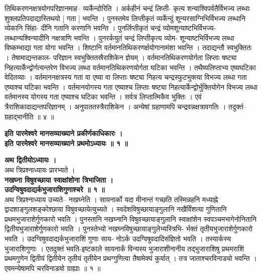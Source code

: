 \documentclass[11pt, openany]{book}
\begin{document}
{{{{\vspace{2mm}
\justifying
 तिथिकरणनक्षत्रयोगपरिज्ञानमाह-- व्यर्केन्दोरिति । अर्कहीनं
चन्द्रं लिप्ती- 
कृत्य शन्याश्विपर्वतैर्विभज्य लब्धाः शुक्लप्रतिपदाद्यास्तिथयो [ गता
] भवन्ति । 
पुनस्तमेव लिप्तीकृतं व्यर्केन्दुं शून्यरसाग्निभिर्विभज्य लब्धानि
व्येकानि सिंहा-
दीनि गतानि करणानि भवन्ति । पुनर्लिप्तीकृतं चन्द्रं
व्योमशून्याष्टभिर्विभज्य-
लब्धान्यश्विन्यादीनि नक्षत्राणि भवन्ति । पुनरर्कयुतं चन्द्रं
लिप्तीकृत्य व्योम-
शून्याष्टभिर्विभज्य लब्धा विष्कम्भाद्या गता योगा भवन्ति । शिष्टानि
वर्तमानतिथिकरणर्क्षयोगानामंशा भवन्ति । तदाद्यन्तौ स्वभुक्तितः ।
तेषामाद्यन्तकाल-
परिज्ञान स्वभुक्तितस्रैराशिकेन ज्ञेयम् । वर्तमानतिथिकरणयोर्गता
लिप्ताः षष्ट्या 
निहत्यार्केन्द्वोर्गत्यन्तरेण विभज्य लब्धा वर्तमानतिथिकरणयोर्गता घटिका
भवन्ति । तथैष्यलिप्ताभ्य एष्यघटिका वेदितव्याः । वर्तमाननक्षत्रस्य
गता वा 
एष्या वा लिप्ताः षष्ट्या निहत्य चन्द्रस्फुटभुक्त्या विभज्य लब्धा गता
एष्याश्च 
घटिका भवन्ति । वर्तमानयोगस्य गता एष्याश्च लिप्ताः षष्ट्या
निहत्यार्केन्द्वोर्भुक्तियोगेन
विभज्य लब्धा वर्तमानस्य योगस्य गता एष्याश्च घटिका भवन्ति
। 
सर्वत्र लिप्तात्मिकैव भुक्तिः । एवं त्रैराशिकादाद्यन्तपरिज्ञानम् ।
अनुपाततस्त्रैराशिकेन ।
अन्येषां ग्रहाणामपि चन्द्रवन्नक्षत्रावगतिः ।
तदुक्तं-- ग्रहाद्भानीति  ॥ ४ ॥ 

\vspace{2mm}
\centering
\textbf{
 इति पारमेश्वरे मानसव्याख्याने प्रकीर्णकाधिकारः । \\
 इति पारमेश्वरे मानसव्याख्याने प्रथमोऽध्यायः ॥ १ ॥}
 
\newpage
\thispagestyle{fancy}
\fancyhf{}
\rhead{[त्रिप्रश्नाधिकारः]}
\centering
\textbf{\large{
 अथ द्वितीयोऽध्यायः । }}\\
 \vspace{2mm}
 अथ त्रिप्रश्नाध्यायः प्रारभ्यते । \\

\vspace{2mm}
\centering
\textbf{
\hspace{-0.5cm}
 नखघ्ना विषुवच्छाया स्वाक्षांशोना त्रिभाजिता । \\
 \hspace{-1cm}
 उदग्विषुवदाद्यर्कभुजाराशिगुणाश्चरे ॥ १ ॥ }\\
 
\vspace{2mm}
\justifying
 अथ त्रिप्रश्नाध्याय उच्यते-- नखघ्नेति । सायनार्को यदा मीनान्तं
गच्छति 
तस्मिन्नहनि मध्याह्ने द्वादशाङ्गुलशङ्कोश्छाया विषुवच्छायेत्युच्यते ।
स्वदेशविषुच्छायाङ्गुलानि
नखैर्विंशत्या गुणितानि प्रथमभुजाराशेर्गुणकारो भवति
। 
पुनस्तानि नखघ्नानि विषुवच्छायाङ्गुलानि स्वाक्षांशेन स्वपञ्चमभागेनोनितानि
द्वितीयभुजाराशेर्गुणकारो भवति । पुनस्तेभ्यो
नखघ्नविषुच्छायाङ्गुलेभ्यस्त्रिभि-
र्भक्तं तृतीयभुजाराशेर्गुणकारो भवति । उदग्विषुवदाद्यर्कभुजाराशिं
गुणाः साय-
नोऽर्क उदग्विषुवदादिसंज्ञितो भवति । तस्यार्कस्य भुजाराशिगुणाः ।
एतदुक्तं 
भवति-इष्टकाले सायनार्कं विन्यस्य भुजाराशीनानीय तद्भुजाराशिषु प्रथमराशिं
प्रथमगुणेन द्वितीयं द्वितीयेन तृतीयं तृतीयेन प्रथग्गुणित्वा तैषामेक्यं
कुर्यात् । 
तत्र जाताश्चरविनाड्यो भवन्ति । एवमन्येषामपि चरविनाडयो ग्राह्याः ॥
१ ॥ 

}}}}
\end{document}
